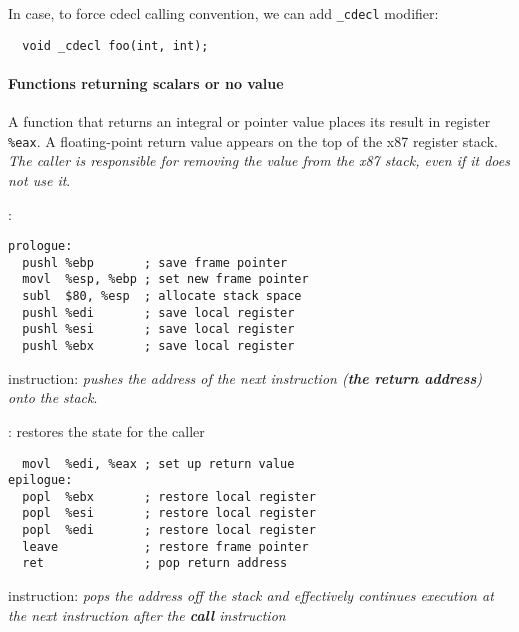 \documentclass{memo}
\begin{document}
\vspace*{0.3cm}

In case, to force cdecl calling convention, we can add \verb+_cdecl+ modifier:
\begin{verbatim}
  void _cdecl foo(int, int);
\end{verbatim}

\paragraph{Functions returning scalars or no value}
A function that returns an integral or pointer value places its result in
register \verb+%eax+. A floating-point return value appears on the top of the
x87 register stack. {\em The caller is responsible for removing the value from
  the x87 stack, even if it does not use it\/}. 

\bit
\w {}:
\begin{verbatim}
prologue:
  pushl %ebp       ; save frame pointer
  movl  %esp, %ebp ; set new frame pointer
  subl  $80, %esp  ; allocate stack space
  pushl %edi       ; save local register
  pushl %esi       ; save local register
  pushl %ebx       ; save local register
\end{verbatim}

\w {} instruction: {\em pushes the address of the next instruction
  ({\bfseries the return address}) onto the stack\/}. 

\w  {}: restores the state for the caller
\begin{verbatim}
  movl  %edi, %eax ; set up return value
epilogue:
  popl  %ebx       ; restore local register
  popl  %esi       ; restore local register
  popl  %edi       ; restore local register
  leave            ; restore frame pointer
  ret              ; pop return address
\end{verbatim}
\w {} instruction: {\em pops the address off the stack and effectively
    continues execution at the next instruction after the {\bfseries call\/}
    instruction} 


\eit
\end{document}
